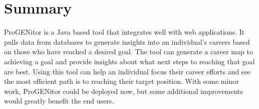\section{Summary}
\label{sect:summary}
ProGENitor is a Java based tool that integrates well with web applications.  It
pulls data from databases to generate insights into an individual's careers
based on those who have reached a desired goal.  The tool can generate a career
map to achieving a goal and provide insights about what next steps to
reaching that goal are best.  Using this tool can help an individual focus their
career efforts and see the most efficient path is to reaching their target
position.  With some minor work, ProGENitor could be deployed now, but some
additional improvements would greatly benefit the end users.
